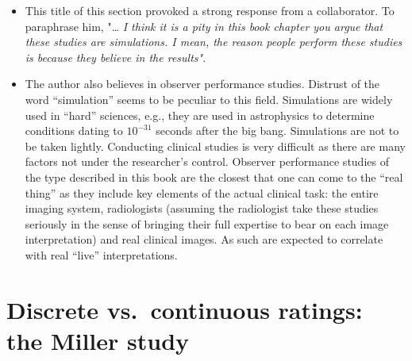 \documentclass[
]{book}
\begin{document}
\begin{itemize}
\item
  This title of this section provoked a strong response from a collaborator. To paraphrase him, "\ldots{} \emph{I think it is a pity in this book chapter you argue that these studies are simulations. I mean, the reason people perform these studies is because they believe in the results"}.
\item
  The author also believes in observer performance studies. Distrust of the word ``simulation'' seems to be peculiar to this field. Simulations are widely used in ``hard'' sciences, e.g., they are used in astrophysics to determine conditions dating to \(10^{-31}\) seconds after the big bang. Simulations are not to be taken lightly. Conducting clinical studies is very difficult as there are many factors not under the researcher's control. Observer performance studies of the type described in this book are the closest that one can come to the ``real thing'' as they include key elements of the actual clinical task: the entire imaging system, radiologists (assuming the radiologist take these studies seriously in the sense of bringing their full expertise to bear on each image interpretation) and real clinical images. As such are expected to correlate with real ``live'' interpretations.
\end{itemize}

\hypertarget{discrete-vs.-continuous-ratings-the-miller-study}{%
\section{Discrete vs.~continuous ratings: the Miller study}\label{discrete-vs.-continuous-ratings-the-miller-study}}
\end{document}
